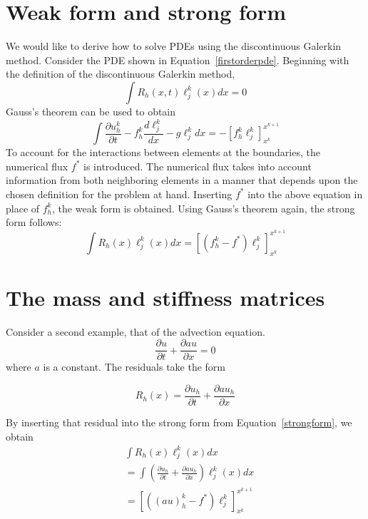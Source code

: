 \documentclass{article}
\begin{document}
\section{Weak form and strong form}

We would like to derive how to solve PDEs using the discontinuous
Galerkin method. Consider the PDE shown in Equation~\ref{firstorderpde}. Beginning with the definition of the discontinuous
Galerkin method,
\begin{equation}
\int R_h(x,t)\ell_j^k(x) dx=0
\end{equation}
Gauss's theorem can be used to obtain
\begin{equation}
\int \frac{\partial u^k_h}{\partial t}-f_h^k\frac{d\ell_j^k}{dx}-g\ell_j^k dx
=-[f_h^k\ell_j^k]_{x^k}^{x^{k+1}}
\end{equation}
To account for the interactions between elements at the boundaries,
the numerical flux $f^*$ is introduced. The numerical flux takes into
account information from both neighboring elements in a manner that
depends upon the chosen definition for the problem at hand. Inserting
$f^*$ into the above equation in place of $f^k_h$, the weak form is
obtained. Using Gauss's theorem again, the strong form follows:
\begin{equation}
\int R_h(x)\ell_j^k(x)dx=[(f_h^k-f^*)\ell_j^k]_{x^k}^{x^{k+1}}
\label{strongform}
\end{equation}

\section{The mass and stiffness matrices}

Consider a second example, that of the advection equation. 
\begin{equation}
\frac{\partial u}{\partial t}+\frac{\partial au}{\partial x}=0
\label{advection}
\end{equation}
where $a$ is a constant. The residuals take the form

\begin{equation}
R_h(x)=\frac{\partial u_h}{\partial t}+\frac{\partial au_h}{\partial x}
\label{advecresid}
\end{equation}

By inserting that residual into the strong form from Equation~\ref{strongform}, we obtain
\begin{eqnarray}
&\int R_h(x)\ell_j^k(x)dx\\
&=\int\left(\frac{\partial u_h}{\partial t}
+\frac{\partial a u_h}{\partial x}\right)\ell_j^k(x)dx\\
&=[((au)_h^k-f^*)\ell_j^k]_{x^k}^{x^{k+1}}
\end{eqnarray}
\end{document}
